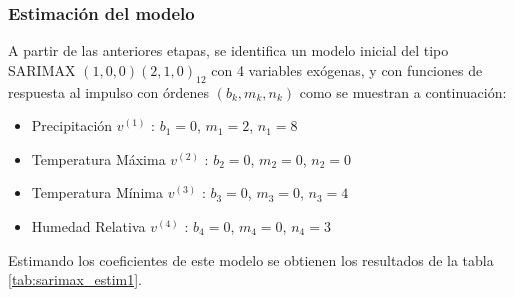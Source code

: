 \documentclass[12pt,oneside]{book}\usepackage[]{graphicx}\usepackage[]{color}
\theoremstyle{definition} %
\begin{document}


\subsubsection{Estimación del modelo}




A partir de las anteriores etapas, se identifica un modelo inicial del tipo SARIMAX $(1,0,0)(2,1,0)_{12}$ con 4 variables exógenas, y con funciones de respuesta al impulso con órdenes $(b_k,m_k,n_k)$ como se muestran a continuación:







\begin{itemize}
\item Precipitación $v^{(1)}$ : $b_1= 0$, $m_1=2$, $n_1=8$
\item Temperatura Máxima $v^{(2)}$ : $b_2= 0$, $m_2=0$, $n_2=0$
\item Temperatura Mínima $v^{(3)}$ : $b_3= 0$, $m_3=0$, $n_3=4$
\item Humedad Relativa $v^{(4)}$ : $b_4= 0$, $m_4=0$, $n_4=3$
\end{itemize}


Estimando los coeficientes de este modelo se obtienen los resultados de la tabla \ref{tab:sarimax_estim1}.
\end{document}
